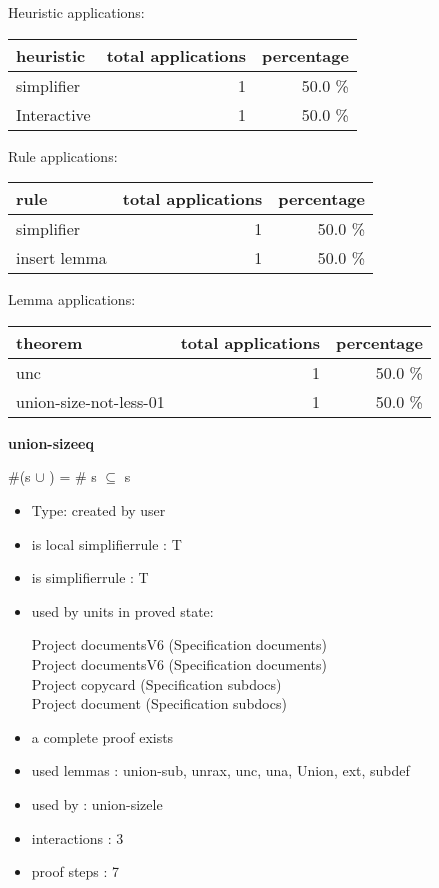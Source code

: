 \documentclass[a4paper]{article}
\begin{document}
\medskip


Heuristic applications:

\begin{supertabular}{l|r|r}
heuristic	& total applications & percentage \\ \hline
simplifier & 1 & 50.0 \% \\
Interactive & 1 & 50.0 \% \\

\end{supertabular}

Rule applications:

\begin{supertabular}{l|r|r}
rule	        & total applications & percentage \\ \hline
simplifier & 1 & 50.0 \% \\
insert lemma & 1 & 50.0 \% \\

\end{supertabular}

Lemma applications:

\begin{supertabular}{l|r|r}
theorem	        & total applications & percentage \\ \hline
unc & 1 & 50.0 \% \\
union-size-not-less-01 & 1 & 50.0 \% \\

\end{supertabular}
\pagebreak

{\LARGE\bf union-sizeeq}\label{lemma-union-sizeeq}

\medskip

 \Fol \#(s $\cup$ ) = \# s \Equiv {} $\subseteq$ s

\begin{itemize}

\item Type: created by user

\item is local simplifierrule : T
\item is simplifierrule : T
\item used by units in proved state:

Project documentsV6 (Specification documents) \\
Project documentsV6 (Specification documents) \\
Project copycard (Specification subdocs) \\
Project document (Specification subdocs)
\item       a complete proof exists
\item       used lemmas  : union-sub, unrax, unc, una, Union, ext, subdef
\item       used by      : union-sizele
\item       interactions : 3
\item       proof steps  : 7
\end{itemize}
\end{document}
